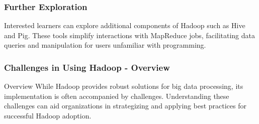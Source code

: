 \documentclass[aspectratio=169]{beamer}
\begin{document}
\begin{frame}[fragile]
    \frametitle{Further Exploration}
    Interested learners can explore additional components of Hadoop such as Hive and Pig. 
    These tools simplify interactions with MapReduce jobs, facilitating data queries and manipulation for users unfamiliar with programming.
\end{frame}

\begin{frame}[fragile]
    \frametitle{Challenges in Using Hadoop - Overview}
    \begin{block}{Overview}
        While Hadoop provides robust solutions for big data processing, its implementation is often accompanied by challenges. Understanding these challenges can aid organizations in strategizing and applying best practices for successful Hadoop adoption.
    \end{block}
\end{frame}
\end{document}
